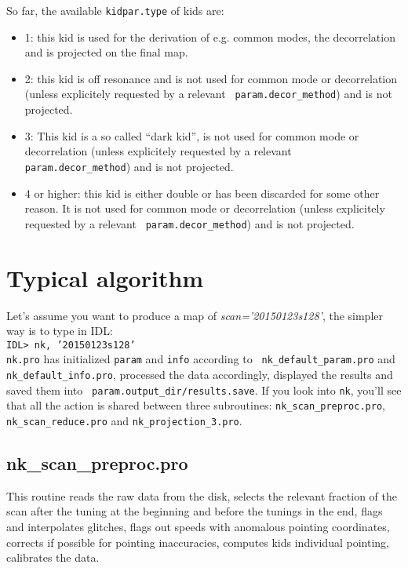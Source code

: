\documentclass[a4paper,10pt]{article}
\begin{document}
So far, the available {\tt kidpar.type} of kids are:
\begin{itemize}
\item 1: this kid is used for the derivation of e.g. common modes, the
  decorrelation and is projected on the final map.
\item 2: this kid is off resonance and is not used for common mode or
  decorrelation (unless explicitely requested by a relevant {\tt
    param.decor\_method}) and is not projected.
\item 3: This kid is a so called ``dark kid'', is not used for common mode or
  decorrelation (unless explicitely requested by a relevant {\tt
    param.decor\_method}) and is not projected.
\item 4 or higher: this kid is either double or has been discarded for some
  other reason. It is not used for common mode or
  decorrelation (unless explicitely requested by a relevant {\tt
    param.decor\_method}) and is not projected.
\end{itemize}


\section{Typical algorithm}

Let's assume you want to produce a map of {\it scan='20150123s128'}, the simpler
way is to type in IDL:\\
{\tt IDL> nk, '20150123s128'}\\

{\tt nk.pro} has initialized {\tt param} and {\tt info} according to {\tt
  nk\_default\_param.pro} and {\tt nk\_default\_info.pro}, processed the data
accordingly, displayed the results and saved them into {\tt
  param.output\_dir/results.save}. If you look into {\tt nk}, you'll see that
all the action is shared between three subroutines: {\tt nk\_scan\_preproc.pro},
{\tt nk\_scan\_reduce.pro} and {\tt nk\_projection\_3.pro}.

\subsection{nk\_scan\_preproc.pro}

This routine reads the raw data from the disk, selects the relevant fraction of
the scan after the tuning at the beginning and before the tunings in the end,
flags and interpolates glitches, flags out speeds with anomalous pointing
coordinates, corrects if possible for pointing inaccuracies, computes kids
individual pointing, calibrates the data.
\end{document}
